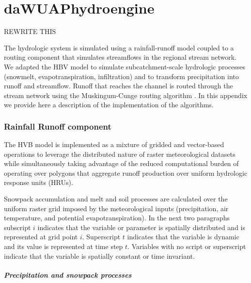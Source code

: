 
\chapter{daWUAPhydroengine}

REWRITE THIS

The hydrologic system is simulated using a rainfall-runoff model coupled to a routing component that simulates streamflows in the regional stream network. We adapted the HBV model \cite{Bergstrom1995, Bergstrom1973} to simulate subcatchment-scale hydrologic processes (snowmelt, evapotranspiration, infiltration) and to transform precipitation into runoff and streamflow. Runoff that reaches the channel is routed through the stream network using the Muskingum-Cunge routing algorithm \cite{Chow1988}. In this appendix we provide here a description of the implementation of the algorithms.

\subsection{Rainfall Runoff component}

The HVB model \cite{Bergstrom1995, Bergstrom1973} is implemented as a mixture of gridded and vector-based operations to leverage the distributed nature of raster meteorological datasets while simultaneously taking advantage of the reduced computational burden of operating over polygons that aggregate runoff production over uniform hydrologic response units (HRUs).

Snowpack accumulation and melt and soil processes are calculated over the uniform raster grid imposed by the meteorological inputs (precipitation, air temperature, and potential evapotranspiration). In the next two paragraphs subscript $i$ indicates that the variable or parameter is spatially distributed and is represented at grid point $i$. Superscript $t$ indicates that the variable is dynamic and its value is represented at time step $t$. Variables with no script or superscript indicate that the variable is spatially constant or time invariant.

\paragraph{Precipitation and snowpack processes}     


